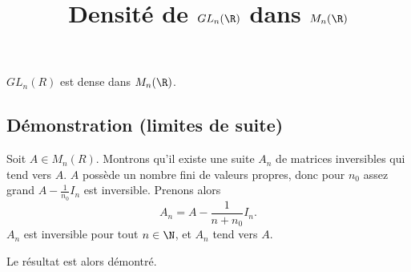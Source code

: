 \documentclass[fontsize=12pt,twoside=false,parskip=half]{scrartcl}
\title{Densité de $GL_n(\R)$ dans $M_n(\R)$}
\date{}
\author{}
\begin{document}
\maketitle
   \begin{Theoreme}
      $GL_n(R)$ est dense dans $M_n(\R)$.
   \end{Theoreme}
   \subsection{Démonstration (limites de suite)}
      Soit $A \in M_n(R)$. Montrons qu’il existe une suite $A_n$ de matrices inversibles qui tend vers $A$.
      $A$ possède un nombre fini de valeurs propres, donc pour $n_0$ assez grand $A - \frac{1}{n_0}I_n$ est 
      inversible. Prenons alors
      \[
         A_n = A - \frac{1}{n + n_0}I_n.
      \]
      $A_n$ est inversible pour tout $n \in \N$, et $A_n$ tend vers $A$.
      
      Le résultat est alors démontré.
\end{document}
